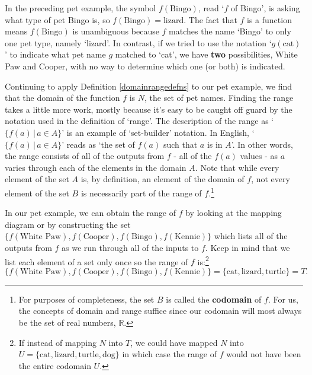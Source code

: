 \documentclass{ximera}
\begin{document}

In the preceding pet example, the symbol $f(\text{Bingo})$, read `$f$ of Bingo', is asking what type of pet Bingo is, so $f(\text{Bingo}) = \text{lizard}$.  The fact that $f$ is a function means $f(\text{Bingo})$ is unambiguous because $f$ matches the name `Bingo' to only one pet type, namely `lizard'. In contrast, if we tried to use the notation `$g(\text{cat})$' to indicate what pet name $g$ matched to `cat', we have \textbf{two} possibilities, White Paw and Cooper, with no way to determine which one (or both) is indicated.  

\medskip

Continuing to apply Definition \ref{domainrangedefns} to our pet example, we find that the domain of the function $f$ is $N$, the set of pet names.  Finding the range takes a little more work, mostly because it's easy to be caught off guard by the notation used in the definition of `range'.  The description of the range as `$\{ f(a) \, | \, a \in A \}$' is an example of `set-builder' notation.  In English,  `$\{ f(a) \, | \, a \in A \}$'  reads as `the set of $f(a)$ such that $a$ is in $A$'.  In other words, the range consists of all of the outputs from $f$ - all of the $f(a)$ values - as $a$ varies through each of the elements in the domain $A$.   Note that while every element of the set $A$ is, by definition, an element of the domain of $f$, not every element of the set $B$ is necessarily part of the range of $f$.\footnote{For purposes of completeness, the set $B$ is called the  \textbf{codomain} of $f$.  For us, the concepts of domain and range suffice since our codomain will most always be the set of real numbers, $\mathbb{R}$.}

\medskip

In our pet example, we can obtain the range of $f$  by looking at the mapping diagram or by constructing the set $\{ f(\text{White Paw}), f(\text{Cooper}), f(\text{Bingo}), f(\text{Kennie}) \}$ which lists all of the outputs from $f$ as we run through all of the inputs to $f$.   Keep in mind that we list each element of a set only once so the range of $f$ is:\footnote{If instead of mapping $N$ into $T$, we could have mapped $N$ into $U=\{ \text{cat}, \text{lizard}, \text{turtle}, \text{dog}\}$ in which case the range of $f$ would not have been the entire codomain $U$.}  \[ \{ f(\text{White Paw}), f(\text{Cooper}), f(\text{Bingo}), f(\text{Kennie}) \} = \{ \text{cat}, \text{lizard}, \text{turtle} \} = T.\] 
\end{document}
